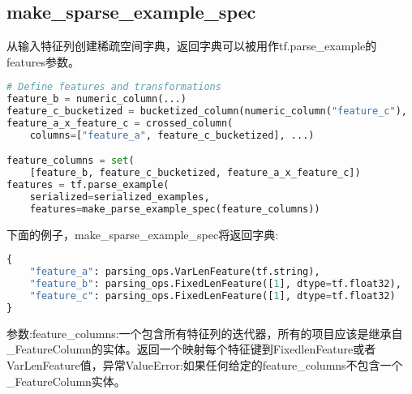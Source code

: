 \subsection{make\_sparse\_example\_spec}
从输入特征列创建稀疏空间字典，返回字典可以被用作tf.parse\_example的features参数。
\begin{lstlisting}[language=Python]
# Define features and transformations
feature_b = numeric_column(...)
feature_c_bucketized = bucketized_column(numeric_column("feature_c"), ...)
feature_a_x_feature_c = crossed_column(
    columns=["feature_a", feature_c_bucketized], ...)

feature_columns = set(
    [feature_b, feature_c_bucketized, feature_a_x_feature_c])
features = tf.parse_example(
    serialized=serialized_examples,
    features=make_parse_example_spec(feature_columns))
\end{lstlisting}
下面的例子，make\_sparse\_example\_spec将返回字典:
\begin{lstlisting}[language=Python]
{
    "feature_a": parsing_ops.VarLenFeature(tf.string),
    "feature_b": parsing_ops.FixedLenFeature([1], dtype=tf.float32),
    "feature_c": parsing_ops.FixedLenFeature([1], dtype=tf.float32)
}
\end{lstlisting}
参数:feature\_columns:一个包含所有特征列的迭代器，所有的项目应该是继承自\_FeatureColumn的实体。返回一个映射每个特征键到FixedlenFeature或者VarLenFeature值，异常ValueError:如果任何给定的feature\_columns不包含一个\_FeatureColumn实体。
